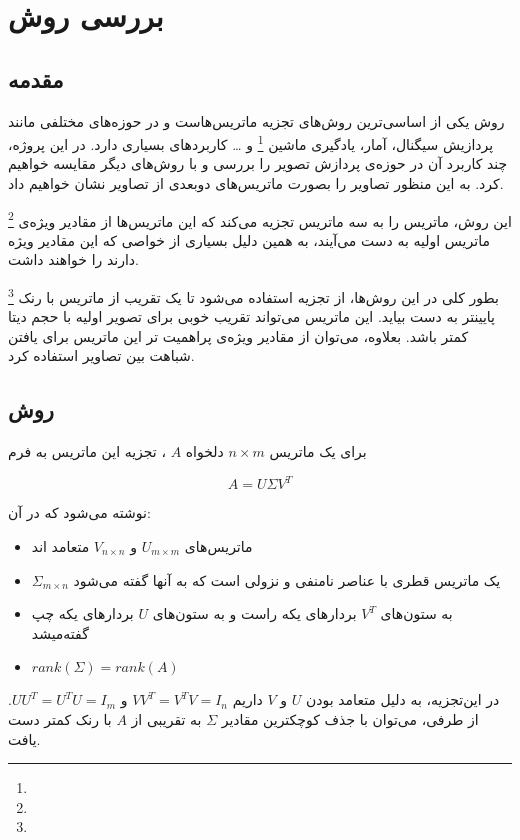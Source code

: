 \chapter{بررسی روش }

\section{مقدمه}
روش 
یکی از اساسی‌ترین روش‌های تجزیه ماتریس‌هاست و در حوزه‌های مختلفی مانند 
پردازیش سیگنال، آمار، یادگیری ماشین
\footnote{
}
و \dots
کاربردهای بسیاری دارد.
در این پروژه، چند کاربرد آن در حوزه‌ی پردازش تصویر را بررسی و با روش‌های دیگر مقایسه خواهیم کرد.
به این منظور تصاویر را بصورت ماتریس‌های دوبعدی از تصاویر 
نشان خواهیم داد.

این روش، ماتریس را به سه ماتریس تجزیه می‌کند که این ماتریس‌ها از مقادیر ویژه‌ی 
\footnote{
}
ماتریس اولیه به دست می‌آیند، به همین دلیل بسیاری از خواصی که این مقادیر ویژه دارند را خواهند داشت.

بطور کلی در این روش‌ها، از تجزیه
استفاده می‌شود تا یک تقریب از ماتریس با رنک
\footnote{
}
پایینتر به دست بیاید.
این ماتریس می‌تواند تقریب خوبی برای 
تصویر اولیه با حجم دیتا کمتر باشد.
بعلاوه، می‌توان از مقادیر ویژه‌ی
پراهمیت تر این
ماتریس برای یافتن شباهت بین تصاویر استفاده کرد.

\section{روش }
برای یک ماتریس 
$n \times m$
دلخواه
$A$
،
تجزیه 
این ماتریس به فرم

\begin{equation}
A = U \Sigma V^T
\end{equation}

نوشته می‌شود که در آن:

\begin{itemize}
  \item ماتریس‌های $U_{m \times m}$ و $V_{n \times n}$ متعامد اند
  \item $\Sigma_{m \times n}$ یک ماتریس قطری با عناصر نامنفی و نزولی است که به آنها  گفته می‌شود
  \item به ستون‌های $V^T$ بردار‌های یکه راست و به ستون‌های $U$ بردار‌های یکه چپ گفته‌میشد
  \item $rank(\Sigma) = rank(A)$
\end{itemize}

در این‌تجزیه، به دلیل متعامد بودن
$U$
و
$V$
داریم 
$VV^T=V^TV=I_n$
و
$UU^T=U^TU=I_m$.
از طرفی، می‌توان با جذف کوچکترین مقادیر 
$\Sigma$
به تقریبی از 
$A$
با رنک کمتر دست یافت.



